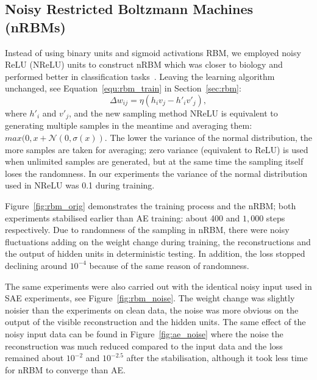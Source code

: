 \subsection{Noisy Restricted Boltzmann Machines (nRBMs)}
Instead of using binary units and sigmoid activations \DIFdelbegin {}\DIFdelend \DIFaddbegin {}\DIFaddend RBM, we employed noisy ReLU (NReLU) units to construct \DIFaddbegin {}\DIFaddend nRBM which was closer to biology and performed better in classification tasks~\citep{nair2010rectified}.
Leaving the learning algorithm unchanged, see Equation~\ref{equ:rbm_train} in Section~\ref{sec:rbm}:
\begin{equation}
\Delta w_{ij} = \eta (h_iv_j - h'_iv'_j),
\label{equ:rbm}
\end{equation} 
where \DIFaddbegin {}\DIFaddend $h'_i$ and $v'_j$\DIFdelbegin {}\DIFdelend , and the new sampling method NReLU is equivalent to generating multiple samples in the meantime and averaging them: $max(0, x+\mathcal{N}(0, \sigma(x))$.
The lower the variance of the normal distribution, the more samples are taken for averaging;
zero variance (equivalent to ReLU) is used when unlimited samples are generated, but at the same time the sampling itself loses the randomness.
In our experiments the variance of the normal distribution used in NReLU was 0.1 during training.


Figure~\ref{fig:rbm_orig} demonstrates the training process and the \DIFdelbegin {}\DIFdelend \DIFaddbegin {}\DIFaddend nRBM; both experiments stabilised earlier than AE training: about 400 and $1,000$ steps respectively.
Due to \DIFaddbegin {}\DIFaddend randomness of the sampling in \DIFaddbegin {}\DIFaddend nRBM, there were noisy fluctuations adding on the weight change during training, the reconstructions and the output of hidden units in deterministic testing.
In addition, the loss stopped declining around $10^{-4}$ because of the same reason of randomness.

The same experiments were also carried out with the identical noisy input used in \DIFaddbegin {}\DIFaddend SAE experiments, see Figure~\ref{fig:rbm_noise}.
The weight change was slightly noisier than the experiments on clean data, \DIFdelbegin {}\DIFdelend \DIFaddbegin {}\DIFaddend the noise was more obvious on the output of the visible reconstruction and the hidden units.
The same effect of the noisy input data can be found in Figure~\ref{fig:ae_noise} where the noise \DIFdelbegin {}\DIFdelend \DIFaddbegin {}\DIFaddend the reconstruction was much reduced compared to the input data and the loss remained about $10^{-2}$ and $10^{-2.5}$ after the stabilisation, although it took less time for \DIFaddbegin {}\DIFaddend nRBM to converge than AE.



